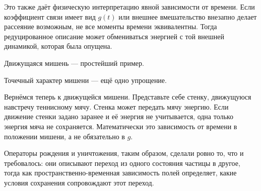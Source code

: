 Это также даёт физическую интерпретацию явной зависимости от времени. Если коэффициент связи имеет вид \(g(t)\) или внешнее вмешательство внезапно делает рассеяние возможным, не все моменты времени эквивалентны. Тогда редуцированное описание может обмениваться энергией с той внешней динамикой, которая была опущена.

\begin{classroomqa}
\end{classroomqa}

Движущаяся мишень — простейший пример.

\begin{classroomqa}
\end{classroomqa}

Точечный характер мишени — ещё одно упрощение.

\begin{classroomqa}
\end{classroomqa}

Вернёмся теперь к движущейся мишени. Представьте себе стенку, движущуюся навстречу теннисному мячу. Стенка может передать мячу энергию. Если движение стенки задано заранее и её энергия не учитывается, одна только энергия мяча не сохраняется. Математически это зависимость от времени в положении мишени, а не обязательно в \(g\).

Операторы рождения и уничтожения, таким образом, сделали ровно то, что и требовалось: они описывают переход из одного состояния частицы в другое, тогда как пространственно-временная зависимость полей определяет, какие условия сохранения сопровождают этот переход.

